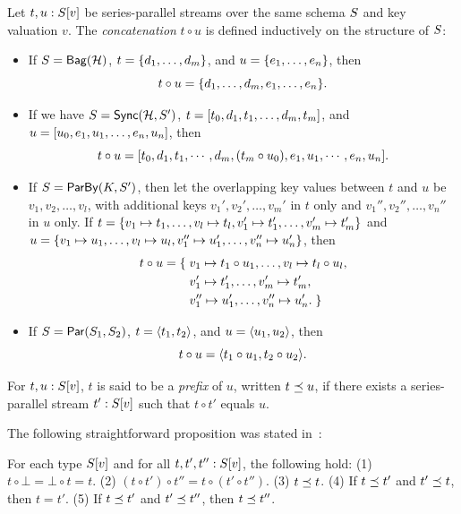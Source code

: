 \begin{definition}
\label{45:def:trace-concat}
Let $t, u: \spstype{v}{\ss}$ be series-parallel streams over the same schema $\ss$ and key valuation $v$.
The  \emph{concatenation} $t \circ u$ is defined inductively on the structure of $\ss$:
\begin{itemize}
\item If $\ss = \relleaf{\mathcal{H}}$,
$t = \spsbag{d_1, \ldots, d_m}$,
and $u = \spsbag{e_1, \ldots, e_n}$,
then
\[t \circ u = \spsbag{d_1, \ldots, d_m, e_1, \ldots, e_n}.\]
\item If we have $\ss = \hier{\mathcal{H}}{\ss'}$,
$t = \spsseq{t_0, d_1, t_1, \ldots, d_m, t_m}$,
and
$u = \spsseq{u_0, e_1, u_1, \ldots, e_n, u_n}$,
then
\[t \circ u =
\spsseq{t_0, d_1, t_1, \cdots, d_m, (t_m \circ u_0), e_1, u_1, \cdots, e_n, u_n}.
\]
\item If $\ss = \keyby{K}{S'}$,
then let the overlapping key values between $t$ and $u$ be
$v_1, v_2, \ldots, v_l$,
with additional keys $v_1', v_2', \ldots, v_m'$ in $t$ only
and $v_1'', v_2'', \ldots, v_n''$ in $u$ only.
If
$t = \spsbag{\keyed{v_1}{t_1}, \ldots, \keyed{v_l}{t_l},
\keyed{v_1'}{t_1'}, \ldots, \keyed{v_m'}{t_m'}}$
and
$u = \spsbag{\keyed{v_1}{u_1}, \ldots, \keyed{v_l}{u_l},
\keyed{v_1''}{u_1'}, \ldots, \keyed{v_n''}{u_n'}}$,
then
\begin{align*}
t \circ u = \spsbagleft{}
&\keyed{v_1}{t_1 \circ u_1}, \ldots, \keyed{v_l}{t_l \circ u_l}, \\
&\keyed{v_1'}{t_1'}, \ldots, \keyed{v_m'}{t_m'}, \\
&\keyed{v_1''}{u_1'}, \ldots, \keyed{v_n''}{u_n'}.\spsbagright{}
\end{align*}
\item If $\ss = \parcomp{\ss_1}{\ss_2}$,
$t = \spspar{t_1}{t_2}$, and $u = \spspar{u_1}{u_2}$,
then
\[
t \circ u = \spspar{t_1 \circ u_1}{t_2 \circ u_2}.
\]
\end{itemize}
For $t, u: \spstype{v}{\ss}$, $t$ is said to be a {\em prefix} of $u$, written $t\prefix u$,
if there exists a series-parallel stream $t' : \spstype{v}{\ss}$ such that $t\circ t'$
equals $u$.
\end{definition}

The following straightforward proposition was stated in~:

\begin{proposition}
\label{45:prop:sps-concat-properties}
For each type $\spstype{v}{\ss}$ and for all $t, t', t'': \spstype{v}{\ss}$,
the following hold:
(1) $t \circ \bot = \bot \circ t = t$.
(2) $(t \circ t') \circ t'' = t \circ (t' \circ t'')$.
(3) $t \prefix t$.
(4) If $t \prefix t'$ and $t' \prefix t$, then $t = t'$.
(5) If $t \prefix t'$ and $t' \prefix t''$, then $t \prefix t''$.
\end{proposition}

